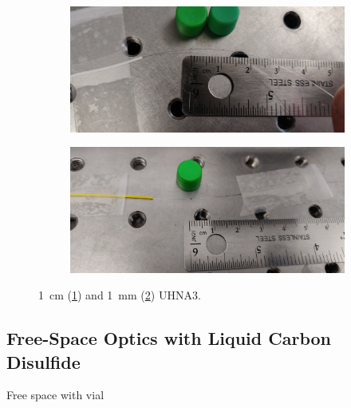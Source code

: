 \begin{figure}[t]
    \centering
    \begin{subfigure}[b]{0.49\textwidth}
        \centering
        \includegraphics[width=\textwidth]{figs/4-Raman/1cm UHNA3.jpeg}
        \caption{}
        \label{fig:Raman:1cmUHNA3pic}
    \end{subfigure}
    \hfill
    \begin{subfigure}[b]{0.49\textwidth}
        \centering
        \includegraphics[width=\textwidth]{figs/4-Raman/1mm UHNA3 in apparatus.jpeg}
        \caption{}
        \label{fig:Raman:1mmUHNA3pic}
    \end{subfigure}
    \caption{\SI{1}{\centi\meter} (\ref{fig:Raman:1cmUHNA3pic}) and \SI{1}{\milli\meter} (\ref{fig:Raman:1mmUHNA3pic}) \ac{UHNA3}.}
    \label{fig:Raman:UHNA3}
\end{figure}

\subsection{Free-Space Optics with Liquid Carbon Disulfide}
\label{subsec:Raman:Target:CS2Vial}

Free space with vial


